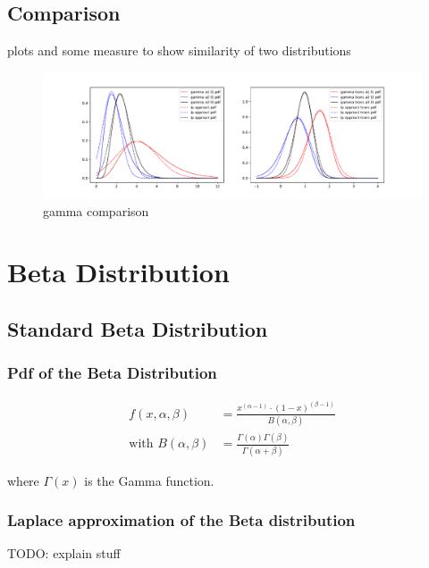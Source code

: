 \documentclass{article}
\begin{document}
\subsection{Comparison}

plots and some measure to show similarity of two distributions

\begin{figure}[!htb]
	\centering
	\includegraphics[width=\textwidth]{gamma_playground.pdf}
	\caption{gamma comparison}
	\label{fig:gamma_comparison}
\end{figure}

\section{Beta Distribution}

\subsection{Standard Beta Distribution}

\subsubsection{Pdf of the Beta Distribution}

\begin{align}
	f(x, \alpha, \beta) &= \frac{x^{(\alpha - 1)} \cdot (1-x)^{(\beta-1)}}{B(\alpha, \beta)} \\
	\text{with }B(\alpha, \beta) &= \frac{\Gamma(\alpha)\Gamma(\beta)}{\Gamma(\alpha + \beta)}
\end{align}

where $\Gamma(x)$ is the Gamma function.

\subsubsection{Laplace approximation of the Beta distribution}

TODO: explain stuff
\end{document}

